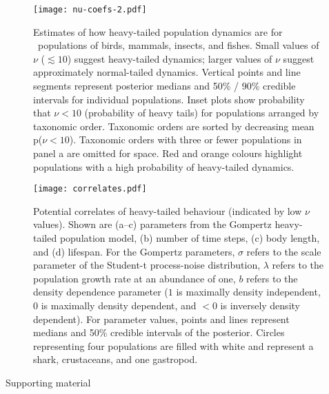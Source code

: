 \documentclass[12pt]{article}
\begin{document}
\clearpage

\begin{figure}[htbp]
\begin{center}
\texttt{[image: nu-coefs-2.pdf]}
\caption{
Estimates of how heavy-tailed population dynamics are for \nuCoefPopN\ populations of birds, mammals, insects, and fishes.
Small values of $\nu$ ($\lesssim 10$) suggest heavy-tailed dynamics; larger values of $\nu$ suggest approximately normal-tailed dynamics.
Vertical points and line segments represent posterior medians and 50\% / 90\% credible intervals for individual populations.
Inset plots show probability that $\nu < 10$ (probability of heavy tails) for populations arranged by taxonomic order.
Taxonomic orders are sorted by decreasing mean p($\nu < 10$).
Taxonomic orders with three or fewer populations in panel a are omitted for space.
Red and orange colours highlight populations with a high probability of heavy-tailed dynamics.
}
\label{fig:nu-coefs}
\end{center}
\end{figure}

\clearpage

\begin{figure}[htbp]
\begin{center}
\texttt{[image: correlates.pdf]}
\caption{
Potential correlates of heavy-tailed behaviour (indicated by low $\nu$ values). Shown are (a--c) parameters from the Gompertz heavy-tailed population model, (b) number of time steps, (c) body length, and (d) lifespan.
For the Gompertz parameters, $\sigma$ refers to the scale parameter of the Student-t process-noise distribution, $\lambda$ refers to the population growth rate at an abundance of one, $b$ refers to the density dependence parameter ($1$ is maximally density independent, $0$ is maximally density dependent, and $<0$ is inversely density dependent).
For parameter values, points and lines represent medians and 50\% credible intervals of the posterior.
Circles representing four populations are filled with white and represent a shark, crustaceans, and one gastropod.
}
\label{fig:correlates}
\end{center}
\end{figure}

\clearpage

\begin{centering}
\LARGE
Supporting material\\[1.5em]
\end{centering}
\end{document}
